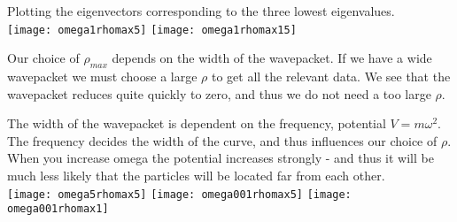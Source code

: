 \documentclass[a4paper,12pt, english]{article}
\begin{document}
Plotting the eigenvectors corresponding to the three lowest eigenvalues.\\

\texttt{[image: omega1rhomax5]}
\texttt{[image: omega1rhomax15]}

Our choice of $\rho_{max}$ depends on the width of the wavepacket. If we have a wide wavepacket we must choose a large $\rho$ to get all the relevant data. We see that the wavepacket reduces quite quickly to zero, and thus we do not need a too large $\rho$.  

The width of the wavepacket is dependent on the frequency, potential $V = m \omega ^ 2$. The frequency decides the width of the curve, and thus influences our choice of $\rho$. \\ 

When you increase omega the potential increases strongly - and thus it will be much less likely that the particles will be located far from each other.  \\

\texttt{[image: omega5rhomax5]}
\texttt{[image: omega001rhomax5]}
\texttt{[image: omega001rhomax1]}
\end{document}
